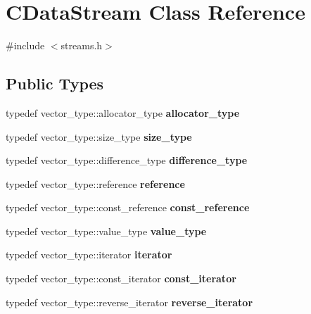 \hypertarget{class_c_data_stream}{}\section{C\+Data\+Stream Class Reference}
\label{class_c_data_stream}


{\ttfamily \#include $<$streams.\+h$>$}

\subsection*{Public Types}
\begin{DoxyCompactItemize}
\item 
\mbox{\label{class_c_data_stream_a297dff00e40bb161aab89fde868ee7b1}} 
typedef vector\+\_\+type\+::allocator\+\_\+type {\bfseries allocator\+\_\+type}
\item 
\mbox{\label{class_c_data_stream_a79e10daad6db0f94aea1e811eb167378}} 
typedef vector\+\_\+type\+::size\+\_\+type {\bfseries size\+\_\+type}
\item 
\mbox{\label{class_c_data_stream_a9da973fb6e53a5335db78b6f8b90bdbf}} 
typedef vector\+\_\+type\+::difference\+\_\+type {\bfseries difference\+\_\+type}
\item 
\mbox{\label{class_c_data_stream_a33723921305add93b45973243faf1541}} 
typedef vector\+\_\+type\+::reference {\bfseries reference}
\item 
\mbox{\label{class_c_data_stream_ada2ac4b4c962dd5a5dcccbc3f71e83ab}} 
typedef vector\+\_\+type\+::const\+\_\+reference {\bfseries const\+\_\+reference}
\item 
\mbox{\label{class_c_data_stream_a5572ddd57b7355f87781b89087dd18e0}} 
typedef vector\+\_\+type\+::value\+\_\+type {\bfseries value\+\_\+type}
\item 
\mbox{\label{class_c_data_stream_abed2013224bdf424e51c78bf483886d3}} 
typedef vector\+\_\+type\+::iterator {\bfseries iterator}
\item 
\mbox{\label{class_c_data_stream_abcfd79b72607505b22f18424e313b4c5}} 
typedef vector\+\_\+type\+::const\+\_\+iterator {\bfseries const\+\_\+iterator}
\item 
\mbox{\label{class_c_data_stream_a93ca1c317b7080997a20b0cf1920b39c}} 
typedef vector\+\_\+type\+::reverse\+\_\+iterator {\bfseries reverse\+\_\+iterator}
\end{DoxyCompactItemize}
